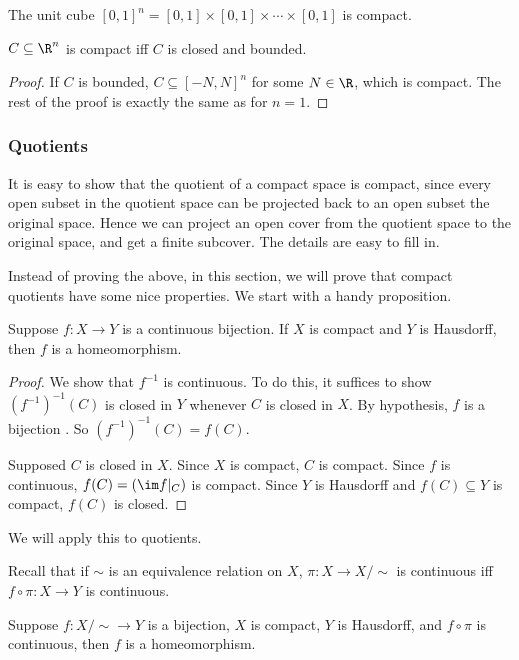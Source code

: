 \documentclass[a4paper]{article}
\begin{document}
\begin{eg}
  The unit cube $[0, 1]^n = [0, 1]\times [0, 1]\times \cdots \times [0, 1]$ is compact.
\end{eg}

\begin{cor}
  $C\subseteq \R^n$ is compact iff $C$ is closed and bounded.
\end{cor}

\begin{proof}
  If $C$ is bounded, $C\subseteq [-N, N]^n$ for some $N \in \R$, which is compact. The rest of the proof is exactly the same as for $n = 1$.
\end{proof}

\subsubsection{Quotients}
It is easy to show that the quotient of a compact space is compact, since every open subset in the quotient space can be projected back to an open subset the original space. Hence we can project an open cover from the quotient space to the original space, and get a finite subcover. The details are easy to fill in.

Instead of proving the above, in this section, we will prove that compact quotients have some nice properties. We start with a handy proposition.
\begin{prop}
  Suppose $f: X\to Y$ is a continuous bijection. If $X$ is compact and $Y$ is Hausdorff, then $f$ is a homeomorphism.
\end{prop}

\begin{proof}
  We show that $f^{-1}$ is continuous. To do this, it suffices to show $(f^{-1})^{-1}(C)$ is closed in $Y$ whenever $C$ is closed in $X$. By hypothesis, $f$ is a bijection . So $(f^{-1})^{-1}(C) = f(C)$.

  Supposed $C$ is closed in $X$. Since $X$ is compact, $C$ is compact. Since $f$ is continuous, $f(C) = (\im f|_C)$ is compact. Since $Y$ is Hausdorff and $f(C) \subseteq Y$ is compact, $f(C)$ is closed.
\end{proof}

We will apply this to quotients.

Recall that if $\sim$ is an equivalence relation on $X$, $\pi: X\to X/{\sim}$ is continuous iff $f\circ \pi: X\to Y$ is continuous.

\begin{cor}
  Suppose $f: X/{\sim} \to Y$ is a bijection, $X$ is compact, $Y$ is Hausdorff, and $f\circ \pi$ is continuous, then $f$ is a homeomorphism.
\end{cor}
\end{document}
